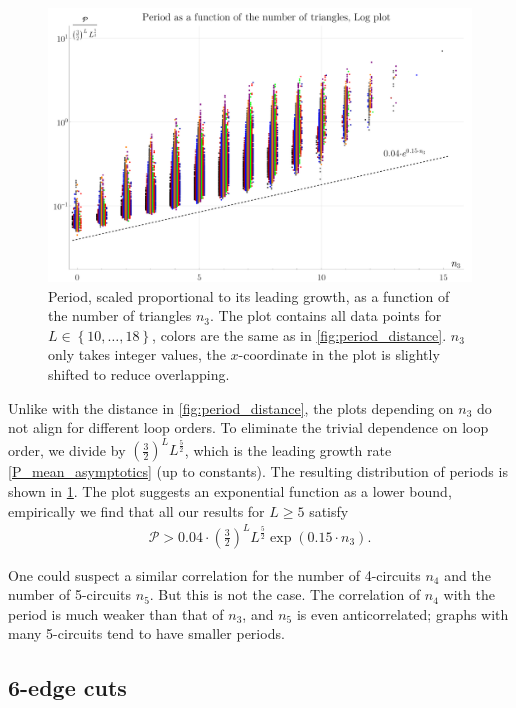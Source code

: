 \documentclass[12pt,a4paper]{article}
\newcommand{\period}{\mathcal P}
\renewcommand{\|}{\rule[-0.4ex]{0.2ex}{1.2em}}
\begin{document}
\begin{figure}[htb]
	\centering
	\includegraphics[width=.9\linewidth]{period_triangles.png}
	\caption{Period, scaled proportional to its leading growth, as a function of the number of triangles $n_3$. The plot contains all data points for $L \in \left \lbrace 10, \ldots, 18 \right \rbrace $, colors are the same as in \cref{fig:period_distance}. $n_3$ only takes integer values, the $x$-coordinate in the plot is slightly shifted to reduce overlapping.  }
	\label{fig:period_triangles}
\end{figure}


Unlike with the distance in \cref{fig:period_distance}, the plots depending on $n_3$ do not align for different loop orders. To eliminate the trivial dependence on loop order, we divide by $\left( \frac 32 \right) ^L L^{\frac 52}$, which is the leading growth rate \cref{P_mean_asymptotics} (up to constants). The resulting distribution of periods is shown in \cref{fig:period_triangles}. The plot suggests an exponential function as a lower bound, empirically we find that all our results for $L \geq 5$ satisfy
\begin{align}\label{period_triangle_bound}
\period > 0.04 \cdot  \left( \frac 32 \right) ^L L^{\frac 52} \exp \left(  0.15 \cdot n_3 \right)  .
\end{align}


One could suspect a similar correlation for the number of 4-circuits $n_4$ and the number of 5-circuits $n_5$. But this is not the case. The correlation of $n_4$ with the period is much weaker than that of $n_3$, and $n_5$ is even anticorrelated; graphs with many 5-circuits tend to have smaller periods. 



\subsection{6-edge cuts}\label{sec:relations_6cuts}
\end{document}

